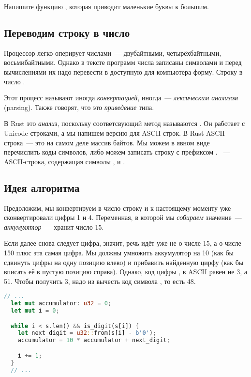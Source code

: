 \begin{Exercise}
  \Question
  Напишите функцию , которая приводит маленькие буквы к большим.
\end{Exercise}

\subsection{Переводим строку в число}

Процессор легко оперирует числами — двубайтными, четырёхбайтными, восьмибайтными.
Однако в тексте программ числа записаны символами и перед вычислениями их надо перевести в доступную для компьютера форму.
Строку  в число .

Этот процесс называют иногда {\em конвертацией}, иногда~--- {\em лексическим анализом} (parsing).
Также говорят, что это {\em приведение} типа.

В Rust это {\em анализ}, поскольку соответсвующий метод называются .
Он работает с Unicode-строками, а мы напишем версию для ASCII-строк.
В Rust ASCII-строка~--- это на самом деле массив байтов.
Мы можем в явном виде перечислить коды символов, либо можем записать строку с префиксом .
~--- ASCII-строка, содержащая символы ,  и .

\subsection{Идея алгоритма}

Предоложим, мы конвертируем в число строку  и к настоящему моменту уже сконвертировали цифры 1 и 4.
Переменная, в которой мы {\em собираем} значение~--- {\em аккумулятор}~--- хранит число 15.

Если далее снова следует цифра, значит, речь идёт уже не о числе 15, а о числе 150 плюс эта самая цифра.
Мы должны умножить аккумулятор на 10 (как бы сдвинуть цифры на одну позицию влево) и прибавить найденную цирфу (как бы вписать её в пустую позицию справа).
Однако, код цифры , в ASCII равен не 3, а 51. Чтобы получить 3, надо из  вычесть код символа , то есть 48.

\begin{lstlisting}[language=Rust]
  // ...
  let mut accumulator: u32 = 0;
  let mut i = 0;

  while i < s.len() && is_digit(s[i]) {
    let next_digit = u32::from(s[i] - b'0');
    accumulator = 10 * accumulator + next_digit;

    i += 1;
  }
  // ...
\end{lstlisting}

